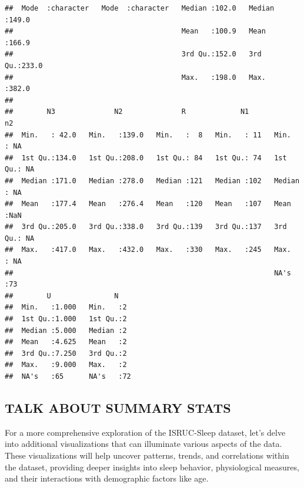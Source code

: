\documentclass[
]{article}
\begin{document}
\begin{verbatim}
##  Mode  :character   Mode  :character   Median :102.0   Median :149.0  
##                                        Mean   :100.9   Mean   :166.9  
##                                        3rd Qu.:152.0   3rd Qu.:233.0  
##                                        Max.   :198.0   Max.   :382.0  
##                                                                       
##        N3              N2              R             N1            n2     
##  Min.   : 42.0   Min.   :139.0   Min.   :  8   Min.   : 11   Min.   : NA  
##  1st Qu.:134.0   1st Qu.:208.0   1st Qu.: 84   1st Qu.: 74   1st Qu.: NA  
##  Median :171.0   Median :278.0   Median :121   Median :102   Median : NA  
##  Mean   :177.4   Mean   :276.4   Mean   :120   Mean   :107   Mean   :NaN  
##  3rd Qu.:205.0   3rd Qu.:338.0   3rd Qu.:139   3rd Qu.:137   3rd Qu.: NA  
##  Max.   :417.0   Max.   :432.0   Max.   :330   Max.   :245   Max.   : NA  
##                                                              NA's   :73   
##        U               N     
##  Min.   :1.000   Min.   :2   
##  1st Qu.:1.000   1st Qu.:2   
##  Median :5.000   Median :2   
##  Mean   :4.625   Mean   :2   
##  3rd Qu.:7.250   3rd Qu.:2   
##  Max.   :9.000   Max.   :2   
##  NA's   :65      NA's   :72
\end{verbatim}

\subsection{TALK ABOUT SUMMARY STATS}\label{talk-about-summary-stats}

For a more comprehensive exploration of the ISRUC-Sleep dataset, let's
delve into additional visualizations that can illuminate various aspects
of the data. These visualizations will help uncover patterns, trends,
and correlations within the dataset, providing deeper insights into
sleep behavior, physiological measures, and their interactions with
demographic factors like age.
\end{document}
